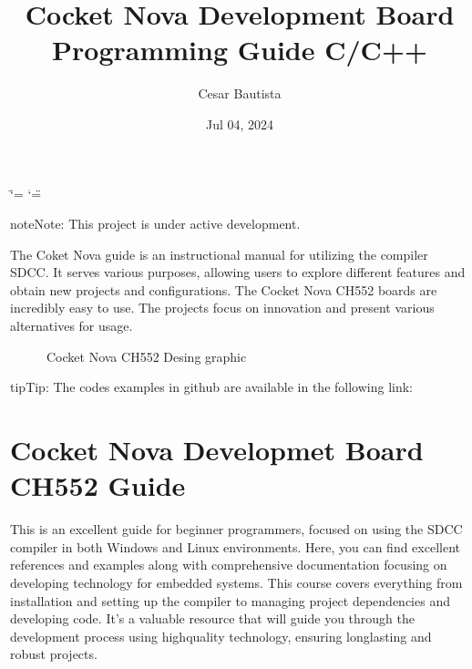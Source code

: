 \documentclass[letterpaper,10pt,english]{sphinxmanual}
\title{Cocket Nova Development Board Programming Guide C/C++}
\date{Jul 04, 2024}
\author{Cesar Bautista}
\begin{document}
\ifdefined\shorthandoff
  \ifnum\catcode`\=\string=\active\shorthandoff{=}\fi
  \ifnum\catcode`\"=\active{}\fi
\fi

\pagestyle{empty}
\sphinxmaketitle
\pagestyle{plain}
\sphinxtableofcontents
\pagestyle{normal}
\label{\detokenize{index::doc}}


\begin{sphinxadmonition}{note}{Note:}
\sphinxAtStartPar
This project is under active development.
\end{sphinxadmonition}

\sphinxAtStartPar
The Coket Nova guide is an instructional manual for utilizing the compiler SDCC. It serves various purposes, allowing users to explore different features and obtain new projects and
configurations.
The Cocket Nova CH552 boards are incredibly easy to use. The projects focus on innovation and
present various alternatives for usage.

\begin{figure}[htbp]
\centering
\capstart

\noindent{}
\caption{Cocket Nova CH552 Desing graphic}\label{\detokenize{index:id1}}\label{\detokenize{index:ch552}}\end{figure}

\begin{sphinxadmonition}{tip}{Tip:}
\sphinxAtStartPar
The codes examples in github are available in the following link: 
\end{sphinxadmonition}

\sphinxstepscope


\chapter{Cocket Nova Developmet Board CH552 Guide}
\label{\detokenize{about:cocket-nova-developmet-board-ch552-guide}}\label{\detokenize{about::doc}}
\sphinxAtStartPar
This is an excellent guide for beginner programmers, focused on using the SDCC compiler in both Windows and Linux environments.
Here, you can find excellent references and examples along with comprehensive documentation focusing on developing technology for embedded systems.
This course covers everything from installation and setting up the compiler to managing project dependencies and developing code.
It’s a valuable resource that will guide you through the development process using high\sphinxhyphen{}quality technology, ensuring long\sphinxhyphen{}lasting and robust projects.
\end{document}
